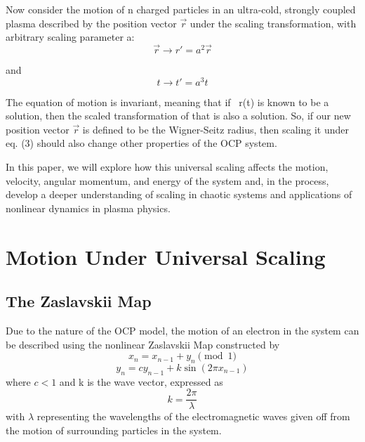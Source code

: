 \documentclass{article}
\begin{document}
Now consider the motion of n charged particles in an ultra-cold, strongly coupled plasma described by the position vector
$\vec{r}$ under the scaling transformation, with arbitrary scaling parameter a:
\begin{equation}
\vec{r} \to r'= a^2 \vec{r}
\end{equation}

and
\begin{equation}
t \to t'= a^3 t
\end{equation}

The equation of motion is invariant, meaning that if ~r(t) is known to be a solution, then
the scaled transformation of that is also a solution. So, if our new position vector $\vec{r}$ is defined to be the Wigner-Seitz radius, then scaling it under eq. (3) should also change other properties of the OCP system.

In this paper, we will explore how this universal scaling affects the motion, velocity, angular momentum, and energy of the system and, in the process, develop a deeper understanding of scaling in chaotic systems and applications of nonlinear dynamics in plasma physics.

\section{Motion Under Universal Scaling}
\subsection{The Zaslavskii Map}
Due to the nature of the OCP model, the motion of an electron in the system can be described using the nonlinear Zaslavskii Map constructed by
\begin{equation}
x_{n} = x_{n-1} + y_{n} \pmod 1
\end{equation}
\begin{equation}
y_{n} = c y_{n-1} + k \sin{(2 \pi x_{n-1})}
\end{equation}
where $c < 1$ and k is the wave vector, expressed as 
\begin{equation}
k = \frac{2 \pi}{\lambda}
\end{equation}
with $\lambda$ representing the wavelengths of the electromagnetic waves given off from the motion of surrounding particles in the system\cite{ocp3}. 
\end{document}
